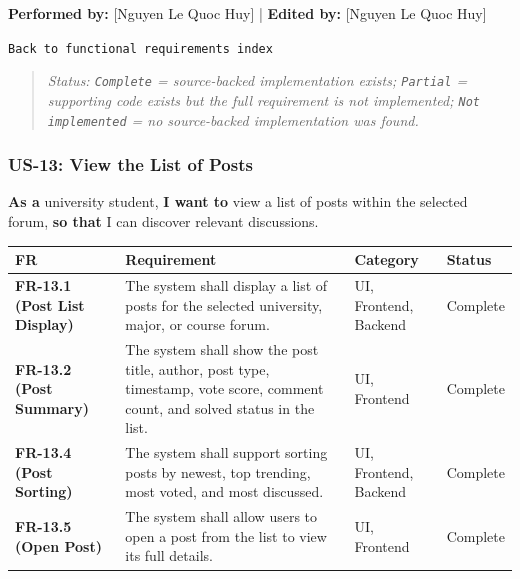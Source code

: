\documentclass[12pt]{article}
\renewcommand{\baselinestretch}{1.5}
\begin{document}
\textbf{Performed by:} [Nguyen Le Quoc Huy] | \textbf{Edited by:} [Nguyen Le Quoc Huy]
\par\medskip

\texttt{Back to functional requirements index}
\par\medskip

\begin{quote}
\textit{Status: \texttt{Complete} = source-backed implementation exists; \texttt{Partial} = supporting code exists but the full requirement is not implemented; \texttt{Not implemented} = no source-backed implementation was found.}
\end{quote}
\par\medskip

\hypertarget{sec:us-13-view-the-list-of-posts}{}
\subsubsection*{US-13: View the List of Posts}
\par\medskip

\textbf{As a} university student, \textbf{I want to} view a list of posts within the selected forum, \textbf{so that} I can discover relevant discussions.
\par\medskip

\begingroup
\small
\renewcommand{\baselinestretch}{1.0}\selectfont
\renewcommand{\arraystretch}{1.15}
\setlength{\tabcolsep}{6pt}
\begin{longtable}{|>{\raggedright\arraybackslash}p{}|>{\raggedright\arraybackslash}p{}|>{\raggedright\arraybackslash}p{}|>{\raggedright\arraybackslash}p{}|}
\hline
\textbf{FR} & \textbf{Requirement} & \textbf{Category} & \textbf{Status} \\ \hline
\endhead
\textbf{FR-13.1 (Post List Display)} & The system shall display a list of posts for the selected university, major, or course forum. & UI, Frontend, Backend & Complete \\ \hline
\textbf{FR-13.2 (Post Summary)} & The system shall show the post title, author, post type, timestamp, vote score, comment count, and solved status in the list. & UI, Frontend & Complete \\ \hline
\textbf{FR-13.4 (Post Sorting)} & The system shall support sorting posts by newest, top trending, most voted, and most discussed. & UI, Frontend, Backend & Complete \\ \hline
\textbf{FR-13.5 (Open Post)} & The system shall allow users to open a post from the list to view its full details. & UI, Frontend & Complete \\ \hline
\end{longtable}
\endgroup
\par\medskip
\end{document}
